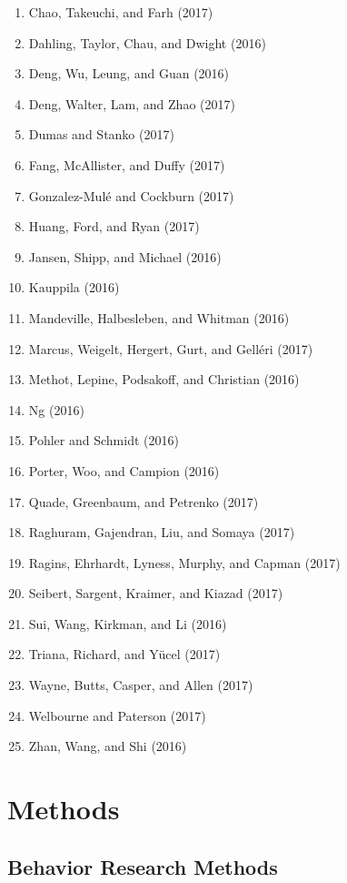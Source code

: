 \documentclass[english,man]{apa6}
\providecommand{\tightlist}{%
  \setlength{\itemsep}{0pt}\setlength{\parskip}{0pt}}
\begin{document}
\begin{enumerate}
\def\labelenumi{\arabic{enumi})}
\tightlist
\item
  Chao, Takeuchi, and Farh (2017)
\item
  Dahling, Taylor, Chau, and Dwight (2016)
\item
  Deng, Wu, Leung, and Guan (2016)
\item
  Deng, Walter, Lam, and Zhao (2017)
\item
  Dumas and Stanko (2017)
\item
  Fang, McAllister, and Duffy (2017)
\item
  Gonzalez-Mulé and Cockburn (2017)
\item
  Huang, Ford, and Ryan (2017)
\item
  Jansen, Shipp, and Michael (2016)
\item
  Kauppila (2016)
\item
  Mandeville, Halbesleben, and Whitman (2016)
\item
  Marcus, Weigelt, Hergert, Gurt, and Gelléri (2017)
\item
  Methot, Lepine, Podsakoff, and Christian (2016)
\item
  Ng (2016)
\item
  Pohler and Schmidt (2016)
\item
  Porter, Woo, and Campion (2016)
\item
  Quade, Greenbaum, and Petrenko (2017)
\item
  Raghuram, Gajendran, Liu, and Somaya (2017)
\item
  Ragins, Ehrhardt, Lyness, Murphy, and Capman (2017)
\item
  Seibert, Sargent, Kraimer, and Kiazad (2017)
\item
  Sui, Wang, Kirkman, and Li (2016)
\item
  Triana, Richard, and Yücel (2017)
\item
  Wayne, Butts, Casper, and Allen (2017)
\item
  Welbourne and Paterson (2017)
\item
  Zhan, Wang, and Shi (2016)
\end{enumerate}

\section{Methods}\label{methods}

\subsection{Behavior Research Methods}\label{behavior-research-methods}
\end{document}
